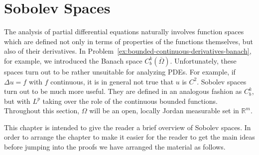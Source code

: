 \section{Sobolev Spaces}\label{chap:sobolev-spaces}

The analysis of partial differential equations naturally involves function spaces which are defined not only in terms of properties of the functions themselves, but also of their derivatives. In Problem~\ref{ex:bounded-continuous-derivatives-banach}, for example, we introduced the Banach space $C_b^k(\overline\Omega)$. Unfortunately, these spaces turn out to be rather unsuitable for analyzing PDEs. For example, if $\Delta u=f$ with $f$ continuous, it is in general not true that $u$ is $C^2$. Sobolev spaces turn out to be much more useful. They are defined in an analogous fashion as $C_b^k$, but with $L^p$ taking over the role of the continuous bounded functions. Throughout this section, $\Omega$ will be an open, locally Jordan measurable set in $\mathbb{R}^m$.

This chapter is intended to give the reader a brief overview of Sobolev spaces. In order to arrange the chapter to make it easier for the reader to get the main ideas before jumping into the proofs we have arranged the material as follows.

